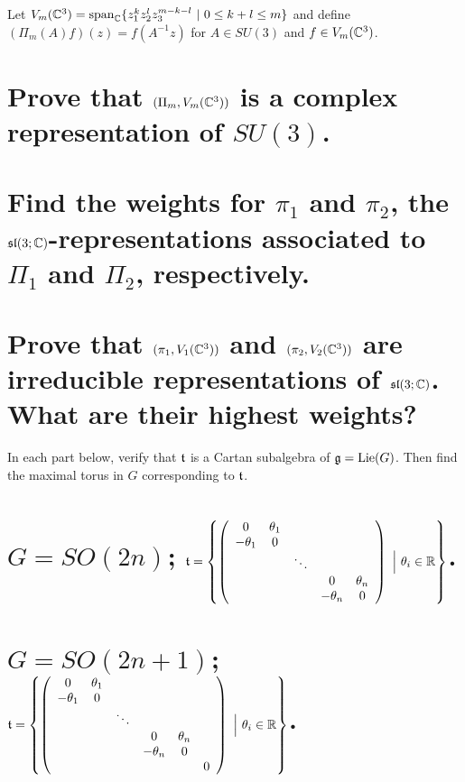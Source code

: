 \documentclass[
	pages,
	boxes,
	color=WildStrawberry
]{homework}
\begin{document}
\begin{problem}
Let $V_{m}(\mathbb{C}^3) = \operatorname{span}_{\mathbb{C}}\{z_1^k z_2^l z_3^{m - k - l} \ |\ 0 \leq k + l \leq m\}$ and define $(\Pi_m(A)f)(z) = f(A^{-1}z)$ for $A \in SU(3)$ and $f \in V_m(\mathbb{C}^3)$.
\begin{parts}
	\part{Prove that $(\Pi_m, V_m(\mathbb{C}^3))$ is a complex representation of $SU(3)$.}\label{part:3a}
	\part{Find the weights for $\pi_1$ and $\pi_2$, the $\mathfrak{sl}(3; \mathbb{C})$-representations associated to $\Pi_1$ and $\Pi_2$, respectively.}\label{part:3b}
	\part{Prove that $(\pi_1, V_1(\mathbb{C}^3))$ and $(\pi_2, V_2(\mathbb{C}^3))$ are irreducible representations of $\mathfrak{sl}(3; \mathbb{C})$. What are their highest weights?}\label{part:3c}
\end{parts}
\end{problem}


\begin{problem}
In each part below, verify that $\mathfrak{t}$ is a Cartan subalgebra of $\mathfrak{g} = \operatorname{Lie}(G)$. Then find the maximal torus in $G$ corresponding to $\mathfrak{t}$.
\begin{parts}
	\part{$G = SO(2n)$; $\mfr{t} = \left\{ \left( \begin{array}{ccccc}0 & \theta_1 &\  & \ & \ \\ -\theta_1 & 0 &\  & \ & \ \\ \ &\ & \ddots & \ &\ \\ \ &\ &\ & 0 & \theta_n\\ \ &\ &\ & -\theta_n & 0 \end{array} \right)\  \Big|\ \theta_i \in \R \right\}$.}\label{part:4a}
	\part{$G = SO(2n+1)$; $\mfr{t} = \left\{ \left( \begin{array}{cccccc}0 & \theta_1 &\  & \ & \ &\  \\ -\theta_1 & 0 &\  & \ & \ &\ \\ \ &\ & \ddots & \ &\ &\  \\ \ &\ &\ & 0 & \theta_n &\ \\ \ &\ &\ & -\theta_n & 0 &\ \\ \ &\ &\ &\ &\ & 0\end{array} \right)\  \Big|\ \theta_i \in \R \right\}$.}\label{part:4b}
\end{parts}
\end{problem}
\end{document}

